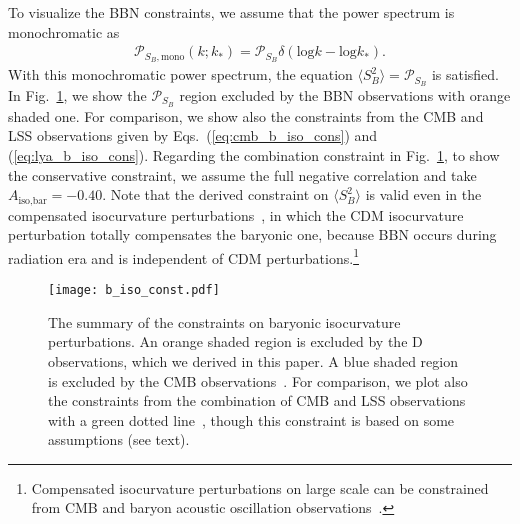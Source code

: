 \documentclass[11pt,a4paper]{article}
\begin{document}
To visualize the BBN constraints, we assume that the power spectrum is monochromatic as
\begin{align}
	\mathcal P_{S_B,\text{mono}}(k;k_*) = \mathcal P_{S_B} \delta(\text{log} k - \text{log} k_* ).
\end{align}
With this monochromatic power spectrum, the equation $\langle S_B^2\rangle = \mathcal P_{S_B}$ is satisfied.
In Fig.~\ref{fig:b_iso_const}, we show the $\mathcal P_{S_B}$ region excluded by the BBN observations with orange shaded one.
For comparison, we show also the constraints from the CMB and LSS observations given by Eqs.~(\ref{eq:cmb_b_iso_cons}) and (\ref{eq:lya_b_iso_cons}). 
Regarding the combination constraint in Fig.~\ref{fig:b_iso_const}, to show the conservative constraint, we assume the full negative correlation and take $A_\text{iso,bar} = -0.40$.
Note that the derived constraint on $\langle S_B^2 \rangle$ is valid even in the compensated isocurvature perturbations~\cite{Gordon:2002gv}, in which the CDM isocurvature perturbation totally compensates the baryonic one, because BBN occurs during radiation era and is independent of CDM perturbations.\footnote{
Compensated isocurvature perturbations on large scale can be constrained from CMB and baryon acoustic oscillation observations~\cite{Grin:2013uya,Munoz:2015fdv,Valiviita:2017fbx,Haga:2018pdl,Soumagnac:2016bjk,Soumagnac:2018atx}.
}


\begin{figure}
  \centering \texttt{[image: b\_iso\_const.pdf]}
  \caption{%
	The summary of the constraints on baryonic isocurvature perturbations.
    An orange shaded region is excluded by the D observations, which we derived in this paper.
	A blue shaded region is excluded by the CMB observations~\cite{Ade:2015lrj}. 
    For comparison, we plot also the constraints from the combination of CMB and LSS observations with a green dotted line~\cite{Seljak:2006bg},
    though this constraint is based on some assumptions (see text).
	}
  \label{fig:b_iso_const}
\end{figure}
\end{document}
